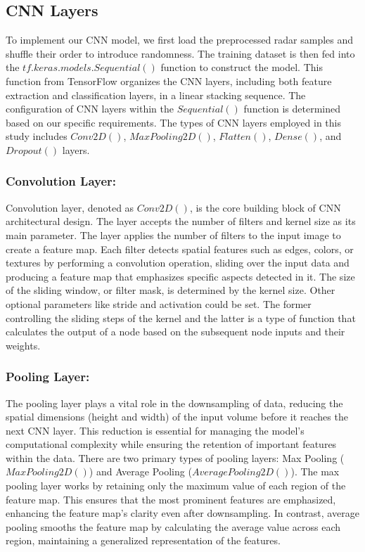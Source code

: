 \documentclass{l4proj}
\begin{document}
\subsection{CNN Layers}
To implement our CNN model, we first load the preprocessed radar samples and shuffle their order to introduce randomness. The training dataset is then fed into the $tf.keras.models.Sequential()$ function to construct the model. This function from TensorFlow organizes the CNN layers, including both feature extraction and classification layers, in a linear stacking sequence. The configuration of CNN layers within the $Sequential()$ function is determined based on our specific requirements. The types of CNN layers employed in this study includes $Conv2D()$, $MaxPooling2D()$, $Flatten()$, $Dense()$, and $Dropout()$ layers.

\subsubsection{Convolution Layer:}
Convolution layer, denoted as $Conv2D()$, is the core building block of CNN architectural design. The layer accepts the number of filters and kernel size as its main parameter. The layer applies the number of filters to the input image to create a feature map. Each filter detects spatial features such as edges, colors, or textures by performing a convolution operation, sliding over the input data and producing a feature map that emphasizes specific aspects detected in it. The size of the sliding window, or filter mask, is determined by the kernel size. Other optional parameters like stride and activation could be set. The former controlling the sliding steps of the kernel and the latter is a type of function that calculates the output of a node based on the subsequent node inputs and their weights.

\subsubsection{Pooling Layer:}
The pooling layer plays a vital role in the downsampling of data, reducing the spatial dimensions (height and width) of the input volume before it reaches the next CNN layer. This reduction is essential for managing the model's computational complexity while ensuring the retention of important features within the data. There are two primary types of pooling layers: Max Pooling ($MaxPooling2D()$) and Average Pooling ($AveragePooling2D()$). The max pooling layer works by retaining only the maximum value of each region of the feature map. This ensures that the most prominent features are emphasized, enhancing the feature map's clarity even after downsampling. In contrast, average pooling smooths the feature map by calculating the average value across each region, maintaining a generalized representation of the features.
\end{document}
